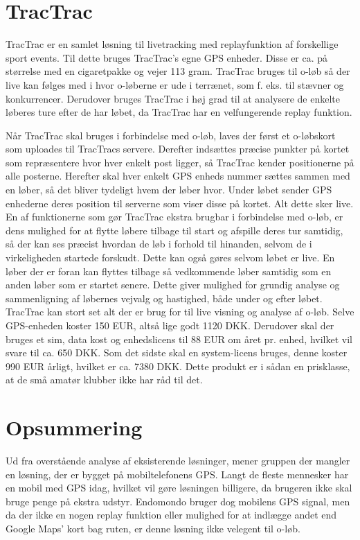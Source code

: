 \section{TracTrac}
TracTrac er en samlet løsning til livetracking med replayfunktion af forskellige sport events. Til dette bruges TracTrac's egne GPS enheder. Disse er ca. på størrelse med en cigaretpakke og vejer 113 gram.\newline
TracTrac bruges til o-løb så der live kan følges med i hvor o-løberne er ude i terrænet, som f. eks. til stævner og konkurrencer. Derudover bruges TracTrac i høj grad til at analysere de enkelte løberes ture efter de har løbet, da TracTrac har en velfungerende replay funktion. 

Når TracTrac skal bruges i forbindelse med o-løb, laves der først et o-løbskort som uploades til TracTracs servere. Derefter indsættes præcise punkter på kortet som repræsentere hvor hver enkelt post ligger, så TracTrac kender positionerne på alle posterne. Herefter skal hver enkelt GPS enheds nummer sættes sammen med en løber, så det bliver tydeligt hvem der løber hvor. Under løbet sender GPS enhederne deres position til serverne som viser disse på kortet. Alt dette sker live. En af funktionerne som gør TracTrac ekstra brugbar i forbindelse med o-løb, er dens mulighed for at flytte løbere tilbage til start og afspille deres tur samtidig, så der kan ses præcist hvordan de løb i forhold til hinanden, selvom de i virkeligheden startede forskudt. Dette kan også gøres selvom løbet er live. En løber der er foran kan flyttes tilbage så vedkommende løber samtidig som en anden løber som er startet senere. Dette giver mulighed for grundig analyse og sammenligning af løbernes vejvalg og hastighed, både under og efter løbet.\newline
TracTrac kan stort set alt der er brug for til live visning og analyse af o-løb. Selve GPS-enheden koster 150 EUR, altså lige godt 1120 DKK. Derudover skal der bruges et sim, data kost og enhedslicens til 88 EUR om året pr. enhed, hvilket vil svare til ca. 650 DKK. Som det sidste skal en system-licens bruges, denne koster 990 EUR årligt, hvilket er ca. 7380 DKK. Dette produkt er i sådan en prisklasse, at de små amatør klubber ikke har råd til det. \citep{TTC}


\section{Opsummering}
Ud fra overstående analyse af eksisterende løsninger, mener gruppen der mangler en løsning, der er bygget på mobiltelefonens GPS. Langt de fleste mennesker har en mobil med GPS idag, hvilket vil gøre løsningen billigere, da brugeren ikke skal bruge penge på ekstra udstyr. Endomondo bruger dog mobilens GPS signal, men da der ikke en nogen replay funktion eller mulighed for at indlægge andet end Google Maps' kort bag ruten, er denne løsning ikke velegent til o-løb. 
